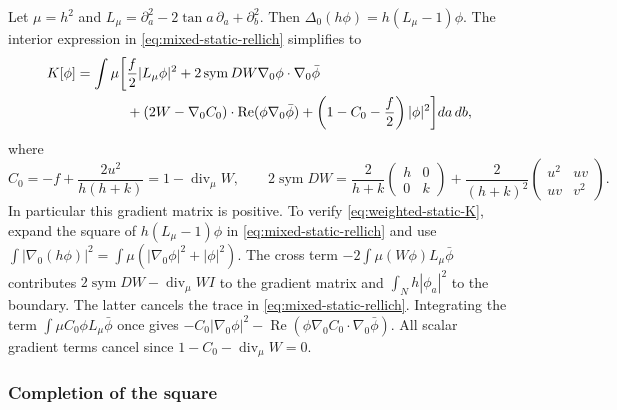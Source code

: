 \documentclass[reqno,11pt]{amsart}
\numberwithin{equation}{section}
\theoremstyle{remark}
\begin{document}
Let $\mu=h^2$ and
$L_\mu=\partial_a^2-2\tan a\,\partial_a+\partial_b^2$.
Then $\Delta_0(h\phi)=h(L_\mu-1)\phi$.
The interior expression in \eqref{eq:mixed-static-rellich} simplifies to
\begin{align}\label{eq:weighted-static-K}
 K[\phi]=\int\mu\bigg[&\frac f2|L_\mu\phi|^2
       +2\operatorname{sym}DW\nabla_0\phi\cdot\nabla_0\bar\phi\\
       &+(2W-\nabla_0C_0)\cdot
                     \operatorname{Re}(\phi\nabla_0\bar\phi)
       +\left(1-C_0-\frac f2\right)|\phi|^2\bigg]da\,db,
       \notag
\end{align}
where
\[
 C_0=-f+\frac{2u^2}{h(h+k)}=1-\operatorname{div}_\mu W,
 \qquad
 2\operatorname{sym}DW
 =\frac{2}{h+k}\begin{pmatrix}h&0\\0&k\end{pmatrix}
   +\frac{2}{(h+k)^2}
                  \begin{pmatrix}u^2&uv\\uv&v^2\end{pmatrix}.
\]
In particular this gradient matrix is positive.  To verify
\eqref{eq:weighted-static-K}, expand the square of
$h(L_\mu-1)\phi$ in \eqref{eq:mixed-static-rellich} and use
$\int|\nabla_0(h\phi)|^2=\int\mu(|\nabla_0\phi|^2+|\phi|^2)$.
The cross term $-2\int\mu(W\phi)L_\mu\bar\phi$ contributes
$2\operatorname{sym}DW-\operatorname{div}_\mu W I$ to the
 gradient matrix and $\int_Nh|\phi_a|^2$ to the boundary.
The latter cancels the trace in
\eqref{eq:mixed-static-rellich}.  Integrating the term
$\int\mu C_0\phi L_\mu\bar\phi$ once gives
$-C_0|\nabla_0\phi|^2-
\operatorname{Re}(\phi\nabla_0C_0\cdot\nabla_0\bar\phi)$.
All scalar gradient terms cancel since
$1-C_0-\operatorname{div}_\mu W=0$.



\subsubsection{Completion of the square}
\end{document}
